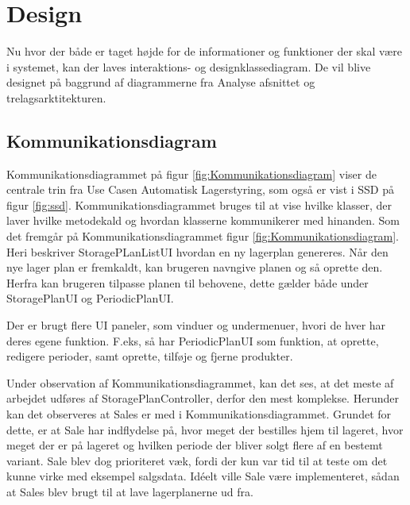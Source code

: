 \chapter{Design}\label{ch:design}
Nu hvor der både er taget højde for de informationer og funktioner der skal være i systemet, kan der laves interaktions- og designklassediagram. De vil blive designet på baggrund af diagrammerne fra Analyse afsnittet og trelagsarktitekturen. 

\section{Kommunikationsdiagram}
Kommunikationsdiagrammet\cite{Larman2004} på figur \ref{fig:Kommunikationsdiagram} viser de centrale trin fra Use Casen Automatisk Lagerstyring, som også er vist i SSD på figur \ref{fig:ssd}. Kommunikationsdiagrammet bruges til at vise hvilke klasser, der laver hvilke metodekald og hvordan klasserne kommunikerer med hinanden. 
Som det fremgår på Kommunikationsdiagrammet figur \ref{fig:Kommunikationsdiagram}. Heri beskriver StoragePLanListUI hvordan en ny lagerplan genereres. Når den nye lager plan er fremkaldt, kan brugeren navngive planen og så oprette den. Herfra kan brugeren tilpasse planen til behovene, dette gælder både under StoragePlanUI og PeriodicPlanUI. 

Der er brugt flere UI paneler, som vinduer og undermenuer, hvori de hver har deres egene funktion. 
F.eks, så har PeriodicPlanUI som funktion, at oprette, redigere perioder, samt oprette, tilføje og fjerne produkter. 

Under observation af Kommunikationsdiagrammet, kan det ses, at det meste af arbejdet udføres af StoragePlanController, derfor den mest komplekse. Herunder kan det observeres at Sales er med i Kommunikationsdiagrammet. Grundet for dette, er at Sale har indflydelse på, hvor meget der bestilles hjem til lageret, hvor meget der er på lageret og hvilken periode der bliver solgt flere af en bestemt variant. 
Sale blev dog prioriteret væk, fordi der kun var tid til at teste om det kunne virke med eksempel salgsdata.
Idéelt ville Sale være implementeret, sådan at Sales blev brugt til at lave lagerplanerne ud fra.


